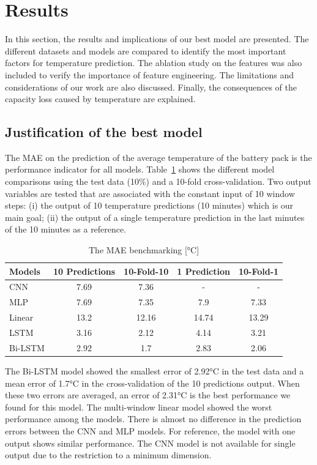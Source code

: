 \section{Results}\label{sec:result}

In this section, the results and implications of our best model are presented. 
The different datasets and models are compared to identify the most important factors for temperature prediction. 
The ablation study on the features was also included to verify the importance of feature engineering. 
The limitations and considerations of our work are also discussed. 
Finally, the consequences of the capacity loss caused by temperature are explained. 

\subsection{Justification of the best model}

The MAE on the prediction of the average temperature of the battery pack is the performance indicator for all models. 
Table~\ref{tab:top_models_settings} shows the different model comparisons using the test data (10\%) and a 10-fold cross-validation. 
Two output variables are tested that are associated with the constant input of 10 window steps: 
(i) the output of 10 temperature predictions (10 minutes) which is our main goal; 
(ii) the output of a single temperature prediction in the last minutes of the 10 minutes as a reference. 

\begin{table}[hbt]
    \centering
    \caption{The MAE benchmarking [°C]}
    \label{tab:top_models_settings}
    \begin{tabular}{lcccc}
    \toprule
        Models & 10 Predictions & 10-Fold-10 & 1 Prediction & 10-Fold-1 \\ 
        \midrule
        \gls{CNN} & 7.69 & 7.36 & - & - \\ 
        \gls{MLP} & 7.69 & 7.35 & 7.9 & 7.33 \\ 
        Linear & 13.2 & 12.16 & 14.74 & 13.29 \\ 
        \gls{LSTM} & 3.16 & 2.12 & 4.14 & 3.21 \\
        \gls{Bi-LSTM} & 2.92 & 1.7 & 2.83 & 2.06 \\ 
    \bottomrule
    \end{tabular}
\end{table}

The \gls{Bi-LSTM} model showed the smallest error of 2.92°C in the test data and a mean error of 1.7°C in the cross-validation of the 10 predictions output. 
When these two errors are averaged, an error of 2.31°C is the best performance we found for this model. 
The multi-window linear model showed the worst performance among the models. 
There is almost no difference in the prediction errors between the \gls{CNN} and \gls{MLP} models. For reference, the model with one output shows similar performance. 
The \gls{CNN} model is not available for single output due to the restriction to a minimum dimension. 

